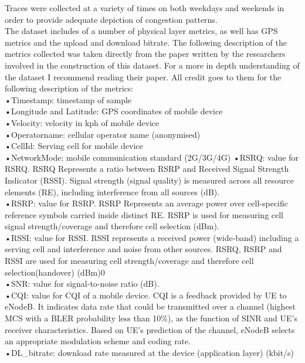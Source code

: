 Traces were collected at a variety of times on both weekdays and weekends in order to provide adequate depiction of congestion patterns. \\

The dataset includes of a number of physical layer metrics, as well has GPS metrics and the upload and download bitrate. The following description of the metrics collected was taken directly from the paper \cite{inproceedings} written by the researchers involved in the construction of this dataset. For a more in depth understanding of the dataset I recommend reading their paper. All credit goes to them for the following description of the metrics: \\

•Timestamp: timestamp of sample \\
•Longitude and Latitude: GPS coordinates of mobile device \\
•Velocity: velocity in kph of mobile device \\ 
•Operatorname: cellular operator name (anonymised) \\
•CellId: Serving cell for mobile device \\
•NetworkMode: mobile communication standard (2G/3G/4G)
•RSRQ: value for RSRQ. RSRQ Represents a ratio between RSRP and Received Signal Strength Indicator (RSSI). Signal strength (signal quality) is measured across all resource elements (RE), including interference from all sources (dB). \\
•RSRP: value for RSRP. RSRP Represents an average power over cell-specific reference symbols carried inside distinct RE. RSRP is used for measuring cell signal strength/coverage and therefore cell selection (dBm). \\
•RSSI: value for RSSI. RSSI represents a received power (wide-band) including a serving cell and interference and noise from other sources. RSRQ, RSRP and RSSI are used for measuring cell strength/coverage and therefore cell selection(handover) (dBm)0\\
•SNR: value for signal-to-noise ratio (dB). \\
•CQI: value for CQI of a mobile device. CQI is a feedback provided by UE to eNodeB. It indicates data rate that could be transmitted over a channel (highest MCS with a BLER probability less than 10\%), as the function of SINR and UE’s receiver characteristics. Based on UE’s prediction of the channel, eNodeB selects an appropriate modulation scheme and coding rate. \\
•DL\_bitrate: download rate measured at the device (application layer) (kbit/s) \\
